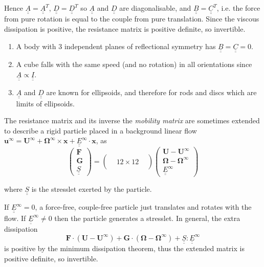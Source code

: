 \documentclass{jknotes}
\newcommand{\dunder}[1]{\underline{\underline{#1}}}
\newcommand{\x}{\bm{x}}
\begin{document}
Hence $\dunder{A} = \dunder{A}^T$, $\dunder{D} = \dunder{D}^T$ so $\dunder{A}$
and $\dunder{D}$ are diagonalisable, and $\dunder{B} = \dunder{C}^T$, i.e. the
force from pure rotation is equal to the couple from pure translation. Since
the viscous dissipation is positive, the resistance matrix is positive
definite, so invertible.

\begin{eg}
	\hspace{2in}
	\begin{enumerate}
		\item A body with $3$ independent planes of reflectional symmetry has
			$\dunder{B} = \dunder{C} = 0$.
		\item A cube falls with the same speed (and no rotation) in all
			orientations since $\dunder{A} \propto \dunder{I}$.
		\item $\dunder{A}$ and $\dunder{D}$ are known for ellipsoids, and
			therefore for rods and discs which are limits of ellipsoids.
	\end{enumerate}
\end{eg}

The resistance matrix and its inverse the \emph{mobility matrix} are sometimes
extended to describe a rigid particle placed in a background linear flow
$\bm{u}^\infty = \bm{U}^\infty + \bm{\Omega}^\infty \times \x +
\dunder{E}^\infty \cdot \x$, as 
\begin{equation}
\begin{pmatrix} \bm{F} \\ \bm{G} \\ \dunder{S} \end{pmatrix} = \begin{pmatrix}
&&\\&12 \times 12 & \\ &&\end{pmatrix} \begin{pmatrix} \bm{U}-\bm{U}^\infty \\
\bm{\Omega} - \bm{\Omega}^\infty \\ \dunder{E}^\infty \end{pmatrix}
\end{equation}

where $\dunder{S}$ is the stresslet exerted by the particle.


If $\dunder{E}^\infty = 0$, a force-free, couple-free particle just translates
and rotates with the flow. If $\dunder{E}^\infty \ne 0 $ then the particle
generates a stresslet. In general, the extra dissipation
\begin{equation}
	\bm{F}\cdot(\bm{U} - \bm{U}^\infty) + \bm{G} \cdot (\bm{\Omega} -
	\bm{\Omega}^\infty) + \dunder{S}:\dunder{E}^\infty
\end{equation}
is positive by the minimum dissipation theorem, thus the extended
matrix is positive definite, so invertible.
\end{document}
